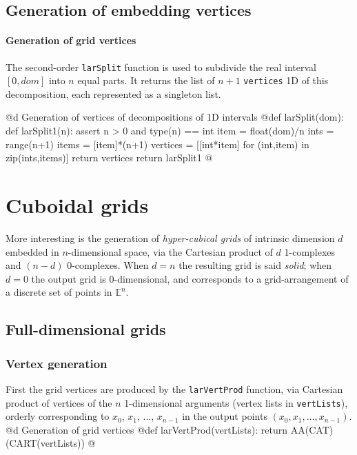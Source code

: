 \documentclass[11pt,oneside]{article}	%
\def\E{\mathbb{E}}
\begin{document}
\subsection{Generation of embedding vertices}

\paragraph{Generation of grid vertices}
The second-order \texttt{larSplit} function is used to subdivide the real interval $[0,dom]$ into $n$ equal parts. It returns the list of $n+1$ \texttt{vertices} 1D of this decomposition, each represented as a singleton list. 

@d Generation of vertices of decompositions of 1D intervals 
@{def larSplit(dom):
    def larSplit1(n):
        assert n > 0 and type(n) == int
        item = float(dom)/n
        ints = range(n+1)
        items = [item]*(n+1)
        vertices = [[int*item] for (int,item) in zip(ints,items)]
        return vertices
    return larSplit1
@}


\section{Cuboidal grids}
\label{sec:cuboids}

More interesting is the generation of \emph{hyper-cubical grids} of intrinsic dimension $d$ embedded in $n$-dimensional space, via the Cartesian product of $d$ 1-complexes and $(n-d)$ 0-complexes. When $d=n$ the resulting grid is said \emph{solid}; when $d=0$ the output grid is 0-dimensional, and corresponds to a grid-arrangement of a discrete set of points in $\E^n$.


\subsection{Full-dimensional grids}

\subsubsection{Vertex generation}

First the grid vertices are produced by the \texttt{larVertProd} function, via Cartesian product of vertices of the $n$ 1-dimensional arguments (vertex lists in \texttt{vertLists}), orderly corresponding to $x_0$, $x_1$, ..., $x_{n-1}$ in the output points $(x_0, x_1,\ldots,x_{n-1})$.
@d Generation of grid vertices 
@{def larVertProd(vertLists):
    return AA(CAT)(CART(vertLists))
@}
\end{document}
